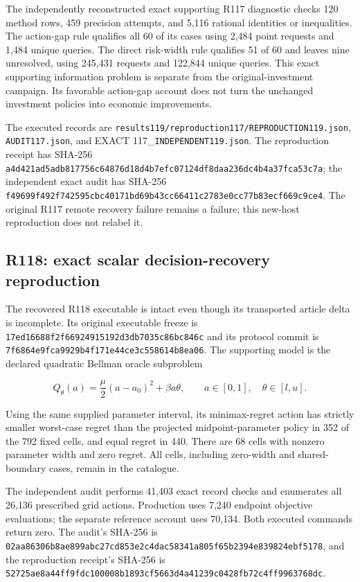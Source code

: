 The independently reconstructed exact supporting R117 diagnostic checks 120 method rows, 459 precision attempts, and 5,116 rational identities or inequalities. The action-gap rule qualifies all 60 of its cases using 2,484 point requests and 1,484 unique queries. The direct risk-width rule qualifies 51 of 60 and leaves nine unresolved, using 245,431 requests and 122,844 unique queries. This exact supporting information problem is separate from the original-investment campaign. Its favorable action-gap account does not turn the unchanged investment policies into economic improvements.

The executed records are \nolinkurl{results119/reproduction117/REPRODUCTION119.json}, \nolinkurl{AUDIT117.json}, and EXACT 117\_\nolinkurl{INDEPENDENT119.json}. The reproduction receipt has SHA-256 \nolinkurl{a4d421ad5adb817756c64876d18d4b7efc07124df8daa236dc4b4a37fca53c7a}; the independent exact audit has SHA-256 \nolinkurl{f49699f492f742595cbc40171bd69b43cc66411c2783e0cc77b83ecf669c9ce4}. The original R117 remote recovery failure remains a failure; this new-host reproduction does not relabel it.

\hypertarget{r118-exact-scalar-decision-recovery-reproduction}{%
\subsection{R118: exact scalar decision-recovery reproduction}\label{r118-exact-scalar-decision-recovery-reproduction}}

The recovered R118 executable is intact even though its transported article delta is incomplete. Its original executable freeze is \nolinkurl{17ed16688f2f66924915192d3db7035c86bc846c} and its protocol commit is \nolinkurl{7f6864e9fca9929b4f171e44ce3c558614b8ea06}. The supporting model is the declared quadratic Bellman oracle subproblem

\[
Q_\theta(a)=\frac{\mu}{2}(a-a_0)^2+\beta a\theta,\qquad
a\in[0,1],\quad\theta\in[l,u].
\]

Using the same supplied parameter interval, its minimax-regret action has strictly smaller worst-case regret than the projected midpoint-parameter policy in 352 of the 792 fixed cells, and equal regret in 440. There are 68 cells with nonzero parameter width and zero regret. All cells, including zero-width and shared-boundary cases, remain in the catalogue.

The independent audit performs 41,403 exact record checks and enumerates all 26,136 prescribed grid actions. Production uses 7,240 endpoint objective evaluations; the separate reference account uses 70,134. Both executed commands return zero. The audit's SHA-256 is \nolinkurl{02aa86306b8ae899abc27cd853e2c4dac58341a805f65b2394e839824ebf5178}, and the reproduction receipt's SHA-256 is \nolinkurl{52725ae8a44ff9fdc100008b1893cf5663d4a41239c0428fb72c4ff9963768dc}.

